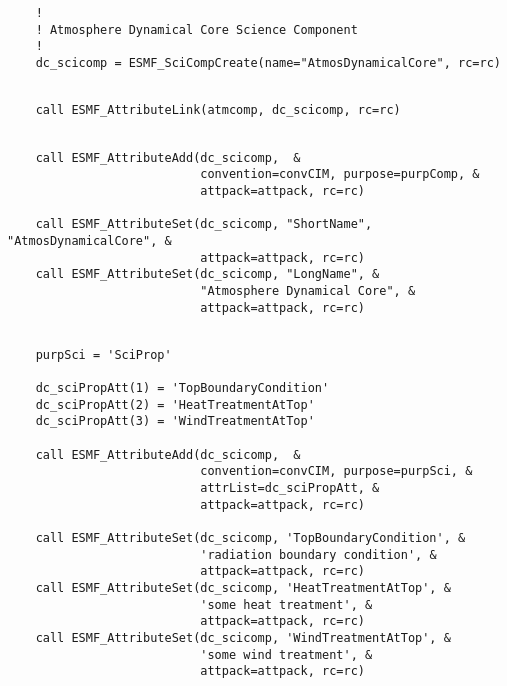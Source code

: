  \begin{verbatim}
    !
    ! Atmosphere Dynamical Core Science Component
    !
    dc_scicomp = ESMF_SciCompCreate(name="AtmosDynamicalCore", rc=rc)
 
\end{verbatim}
 

 \begin{verbatim}
    call ESMF_AttributeLink(atmcomp, dc_scicomp, rc=rc)
 
\end{verbatim}
 

 \begin{verbatim}
    call ESMF_AttributeAdd(dc_scicomp,  &
                           convention=convCIM, purpose=purpComp, &
                           attpack=attpack, rc=rc)

    call ESMF_AttributeSet(dc_scicomp, "ShortName", "AtmosDynamicalCore", &
                           attpack=attpack, rc=rc)
    call ESMF_AttributeSet(dc_scicomp, "LongName", &
                           "Atmosphere Dynamical Core", &
                           attpack=attpack, rc=rc)
 
\end{verbatim}
 

 \begin{verbatim}
    purpSci = 'SciProp'

    dc_sciPropAtt(1) = 'TopBoundaryCondition'
    dc_sciPropAtt(2) = 'HeatTreatmentAtTop'
    dc_sciPropAtt(3) = 'WindTreatmentAtTop'

    call ESMF_AttributeAdd(dc_scicomp,  &
                           convention=convCIM, purpose=purpSci, &
                           attrList=dc_sciPropAtt, &
                           attpack=attpack, rc=rc)

    call ESMF_AttributeSet(dc_scicomp, 'TopBoundaryCondition', &
                           'radiation boundary condition', &
                           attpack=attpack, rc=rc)
    call ESMF_AttributeSet(dc_scicomp, 'HeatTreatmentAtTop', &
                           'some heat treatment', &
                           attpack=attpack, rc=rc)
    call ESMF_AttributeSet(dc_scicomp, 'WindTreatmentAtTop', &
                           'some wind treatment', &
                           attpack=attpack, rc=rc)
 
\end{verbatim}
 
